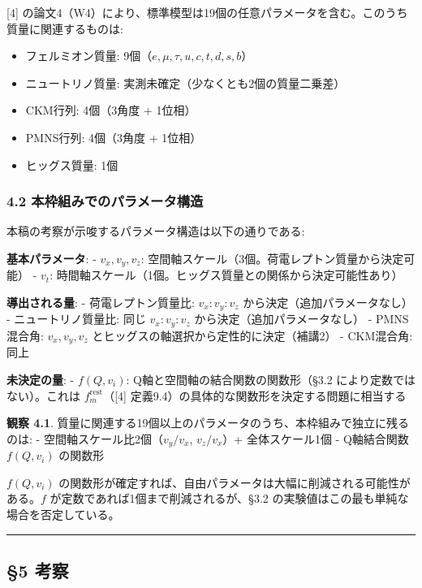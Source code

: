 \documentclass[
  a4paper,11pt]{ltjsarticle}
\providecommand{\tightlist}{%
  \setlength{\itemsep}{0pt}\setlength{\parskip}{0pt}}
\begin{document}
{[}4{]}
の論文4（W4）により、標準模型は19個の任意パラメータを含む。このうち質量に関連するものは:

\begin{itemize}
\tightlist
\item
  フェルミオン質量: 9個（\(e, \mu, \tau, u, c, t, d, s, b\)）
\item
  ニュートリノ質量: 実測未確定（少なくとも2個の質量二乗差）
\item
  CKM行列: 4個（3角度 + 1位相）
\item
  PMNS行列: 4個（3角度 + 1位相）
\item
  ヒッグス質量: 1個
\end{itemize}

\subsubsection{4.2
本枠組みでのパラメータ構造}\label{ux672cux67a0ux7d44ux307fux3067ux306eux30d1ux30e9ux30e1ux30fcux30bfux69cbux9020}

本稿の考察が示唆するパラメータ構造は以下の通りである:

\textbf{基本パラメータ}: - \(v_x, v_y, v_z\):
空間軸スケール（3個。荷電レプトン質量から決定可能） - \(v_t\):
時間軸スケール（1個。ヒッグス質量との関係から決定可能性あり）

\textbf{導出される量}: - 荷電レプトン質量比: \(v_x : v_y : v_z\)
から決定（追加パラメータなし） - ニュートリノ質量比: 同じ
\(v_x : v_y : v_z\) から決定（追加パラメータなし） - PMNS混合角:
\(v_x, v_y, v_z\) とヒッグスの軸選択から定性的に決定（補講2） -
CKM混合角: 同上

\textbf{未決定の量}: - \(f(Q, v_i)\):
Q軸と空間軸の結合関数の関数形（§3.2 により定数ではない）。これは
\(f_m^{\text{rest}}\)（{[}4{]}
定義9.4）の具体的な関数形を決定する問題に相当する

\textbf{観察 4.1}.
質量に関連する19個以上のパラメータのうち、本枠組みで独立に残るのは: -
空間軸スケール比2個（\(v_y/v_x\), \(v_z/v_x\)）+ 全体スケール1個 -
Q軸結合関数 \(f(Q, v_i)\) の関数形

\(f(Q, v_i)\)
の関数形が確定すれば、自由パラメータは大幅に削減される可能性がある。\(f\)
が定数であれば1個まで削減されるが、§3.2
の実験値はこの最も単純な場合を否定している。

\begin{center}\rule{0.5\linewidth}{0.5pt}\end{center}

\subsection{§5 考察}\label{ux8003ux5bdf}
\end{document}
